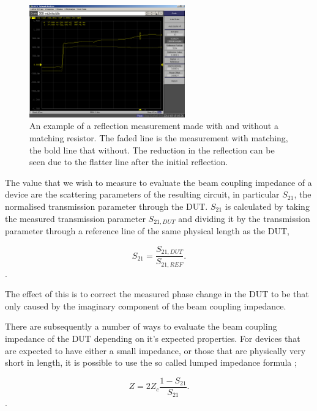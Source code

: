 \begin{figure}
\begin{center}
\includegraphics[width=0.6\textwidth]{Bench_Top_Measurements/figures/coax-matching-no-matching.png}
\end{center}
\caption{An example of a reflection measurement made with and without a matching resistor. The faded line is the measurement with matching, the bold line that without. The reduction in the reflection can be seen due to the flatter line after the initial reflection.}
\label{fig:matching-plot}
\end{figure}

The value that we wish to measure to evaluate the beam coupling impedance of a device are the scattering parameters of the resulting circuit, in particular $S_{21}$, the normalised transmission parameter through the DUT. $S_{21}$ is calculated by taking the measured transmission parameter $S_{21,DUT}$ and dividing it by the transmission parameter through a reference line of the same physical length as the DUT,

\begin{equation}
S_{21} = \frac{S_{21,DUT}}{S_{21,REF}}.
\end{equation}.

The effect of this is to correct the measured phase change in the DUT to be that only caused by the imaginary component of the beam coupling impedance.

There are subsequently a number of ways to evaluate the beam coupling impedance of the DUT depending on it's expected properties. For devices that are expected to have either a small impedance, or those that are physically very short in length, it is possible to use the so called lumped impedance formula \cite{Hahn:BenchMeasInter, Hahn: ValidityImpMeas};

\begin{equation}
Z = 2Z_{c} \frac{1-S_{21}}{S_{21}}.
\end{equation}.

